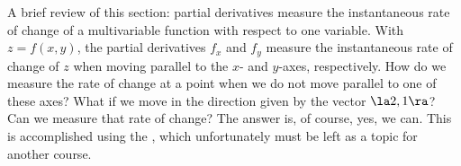 A brief review of this section: partial derivatives measure the instantaneous rate of change of a multivariable function with respect to one variable. %
With $z=f(x,y)$, the partial derivatives $f_x$ and $f_y$ measure the instantaneous rate of change of $z$ when moving parallel to the $x$- and $y$-axes, respectively. How do we measure the rate of change at a point when we do not move parallel to one of these axes? What if we move in the direction given by the vector $\la 2,1\ra$? Can we measure that rate of change? The answer is, of course, yes, we can. This is accomplished using the , which unfortunately must be left as a topic for another course.


